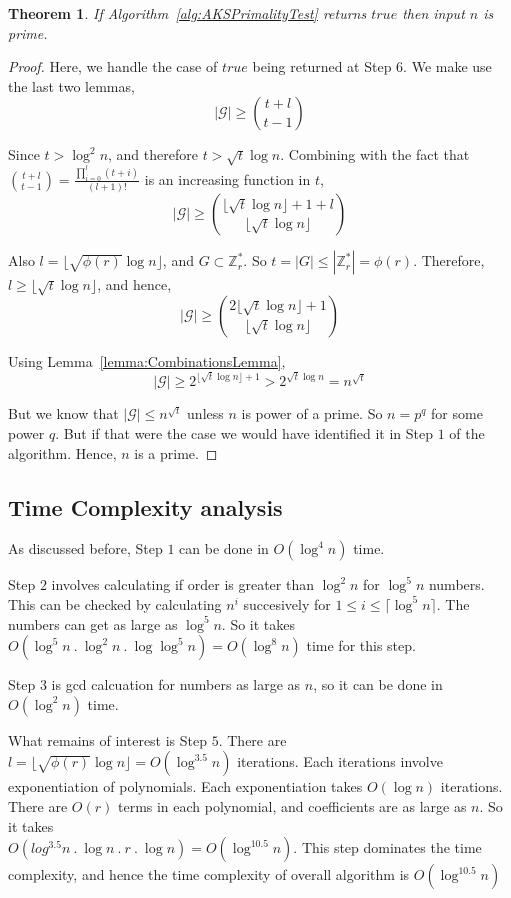 \documentclass[11pt]{article}
\newtheorem{theorem}{Theorem}[section]
\begin{document}
\begin{theorem}
If Algorithm~\ref{alg:AKSPrimalityTest} returns $true$ then input $n$ is prime.
\end{theorem}
\begin{proof}
Here, we handle the case of $true$ being returned at Step $6$. We make use the last two lemmas,
\[|\mathcal{G}| \geq {{t+l} \choose {t-1}}\]

Since $t > \log^2 n$, and therefore $t > \sqrt t \log n$. Combining with the fact that ${{t+l} \choose {t-1}} = \frac{\prod_{i=0}^l{(t+i)}}{(l+1)!}$ is an increasing function in $t$,
\[|\mathcal{G}| \geq {{{\lfloor \sqrt t \log n \rfloor} + 1 + l} \choose {\lfloor \sqrt t \log n \rfloor}}\]

Also $l = \lfloor \sqrt{\phi(r)} \log n \rfloor$, and $G \subset \mathbb{Z}_r^{*}$. So $t = |G| \leq |\mathbb{Z}_r^{*}| = \phi(r)$. Therefore, $l \geq \lfloor \sqrt{t} \log{n} \rfloor$, and hence,
\[|\mathcal{G}| \geq {{2{\lfloor \sqrt t \log n \rfloor}+1} \choose {\lfloor \sqrt t \log n \rfloor}}\]

Using Lemma~\ref{lemma:CombinationsLemma},
\[|\mathcal{G}| \geq 2^{{\lfloor \sqrt t \log n \rfloor}+1} > 2^{\sqrt t \log n} = n^{\sqrt t}\]

But we know that $|\mathcal{G}| \leq n^{\sqrt t}$ unless $n$ is power of a prime. So $n = p^{q}$ for some power $q$. But if that were the case we would have identified it in Step $1$ of the algorithm. Hence, $n$ is a prime.

\end{proof}
\subsection{Time Complexity analysis}
As discussed before, Step $1$ can be done in $O(\log^4 n)$ time.

Step $2$ involves calculating if order is greater than $\log^2 n$ for $\log^5 n$ numbers. This can be checked by calculating $n^i$ succesively for $1 \leq i \leq \lceil \log^5 n \rceil$. The numbers can get as large as $\log^5 n$. So it takes \\$O({\log^5 n}\ .\ {\log^2 n}\ .\ {\log{\log^5 n}}) = O(\log^8 n)$ time for this step.

Step $3$ is gcd calcuation for numbers as large as $n$, so it can be done in $O(\log^2 n)$ time.

What remains of interest is Step $5$. There are $l = \lfloor \sqrt{\phi(r)} \log n \rfloor = O(\log^{3.5}n)$ iterations. Each iterations involve exponentiation of polynomials. Each exponentiation takes $O(\log n)$ iterations. There are $O(r)$ terms in each polynomial, and coefficients are as large as $n$. So it takes \\$O({log^{3.5}n}\ .\ {\log n}\ .\ {r}\ .\ {\log n})= O(\log^{10.5}n)$. This step dominates the time complexity, and hence the time complexity of overall algorithm is $O(\log^{10.5}n)$
\end{document}

